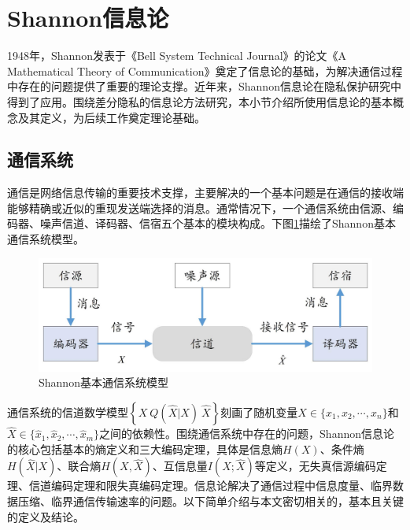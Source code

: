 \section{Shannon信息论}
1948年，Shannon\cite{shannon1948a}发表于《Bell System Technical Journal》的论文《A Mathematical Theory of Communication》奠定了信息论的基础，为解决通信过程中存在的问题提供了重要的理论支撑。近年来，Shannon信息论在隐私保护研究中得到了应用。围绕差分隐私的信息论方法研究，本小节介绍所使用信息论的基本概念及其定义，为后续工作奠定理论基础。
\subsection{通信系统}\label{sec:shannon_comunication_system}
通信是网络信息传输的重要技术支撑，主要解决的一个基本问题是在通信的接收端能够精确或近似的重现发送端选择的消息。通常情况下，一个通信系统由信源、编码器、噪声信道、译码器、信宿五个基本的模块构成\cite{shannon1948a}。下图\ref{fig:chapter03-communication-model}描绘了Shannon基本通信系统模型。
\begin{figure}[htbp]
	\centering
	\includegraphics[width = 0.65\linewidth]{./figures/chapter03_1.jpg}
	\caption{Shannon基本通信系统模型}
	\label{fig:chapter03-communication-model}
\end{figure}

通信系统的信道数学模型$\left\{X~ Q(\hat{X}|X)~\hat{X}\right\}$刻画了随机变量$X\in\{x_1,x_2,\cdots,x_n\}$和$\hat{X}\in\{\hat{x}_1,\hat{x}_2,\cdots,\hat{x}_m\}$之间的依赖性。围绕通信系统中存在的问题，Shannon信息论的核心包括基本的熵定义和三大编码定理，具体是信息熵$H(X)$、条件熵$H(\hat{X}|X)$、联合熵$H(X,\hat{X})$、互信息量$I(X;\hat{X})$等定义，无失真信源编码定理、信道编码定理和限失真编码定理\cite{shannon1948a,Shannon1959Coding,cover2006elements}。信息论解决了通信过程中信息度量、临界数据压缩、临界通信传输速率的问题。以下简单介绍与本文密切相关的，基本且关键的定义及结论。
